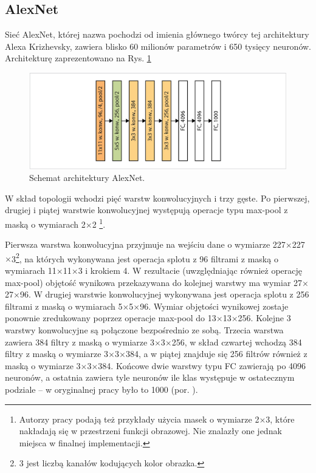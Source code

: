 \subsection{AlexNet}
\label{AlexNet}
Sieć AlexNet, której nazwa pochodzi od imienia głównego twórcy tej architektury Alexa Krizhevsky, zawiera blisko 60 milionów parametrów i 650 tysięcy neuronów. Architekturę zaprezentowano na Rys. \ref{AlexNetTopology}
\begin{figure}[h!]
	\centering
	\includegraphics[width=1\textwidth]{figures/AlexNet.png}
	\caption{Schemat architektury AlexNet.}
	\label{AlexNetTopology}
\end{figure}

W skład topologii wchodzi pięć warstw konwolucyjnych i trzy gęste. Po pierwszej, drugiej i piątej warstwie konwolucyjnej występują operacje typu max-pool z maską o wymiarach 2$\times$2 \footnote{Autorzy pracy podają też przykłady użycia masek o wymiarze 2$\times$3, które nakładają się w przestrzeni funkcji obrazowej. Nie znalazły one jednak miejsca w finalnej implementacji.}. 

Pierwsza warstwa konwolucyjna przyjmuje na wejściu dane o wymiarze 227$\times$227$\times$3\footnote{3 jest liczbą kanałów kodujących kolor obrazka.}, na których wykonywana jest operacja splotu z 96 filtrami z maską o wymiarach 11$\times$11$\times$3 i krokiem 4. W rezultacie (uwzględniając również operację max-pool) objętość wynikowa przekazywana do kolejnej warstwy ma wymiar 27$\times$27$\times$96. W drugiej warstwie konwolucyjnej wykonywana jest operacja splotu z 256 filtrami z maską o wymiarach 5$\times$5$\times$96. Wymiar objętości wynikowej zostaje ponownie zredukowany poprzez operacje max-pool do 13$\times$13$\times$256. Kolejne 3 warstwy konwolucyjne są połączone bezpośrednio ze sobą. Trzecia warstwa zawiera 384 filtry z maską o wymiarze 3$\times$3$\times$256, w skład czwartej wchodzą 384 filtry z maską o wymiarze 3$\times$3$\times$384, a w piątej znajduje się 256 filtrów również z maską o wymiarze 3$\times$3$\times$384. Końcowe dwie warstwy typu FC zawierają po 4096 neuronów, a ostatnia zawiera tyle neuronów ile klas występuje w ostatecznym podziale -- w oryginalnej pracy było to 1000 (por. \cite{Krizhevsky2012}).

